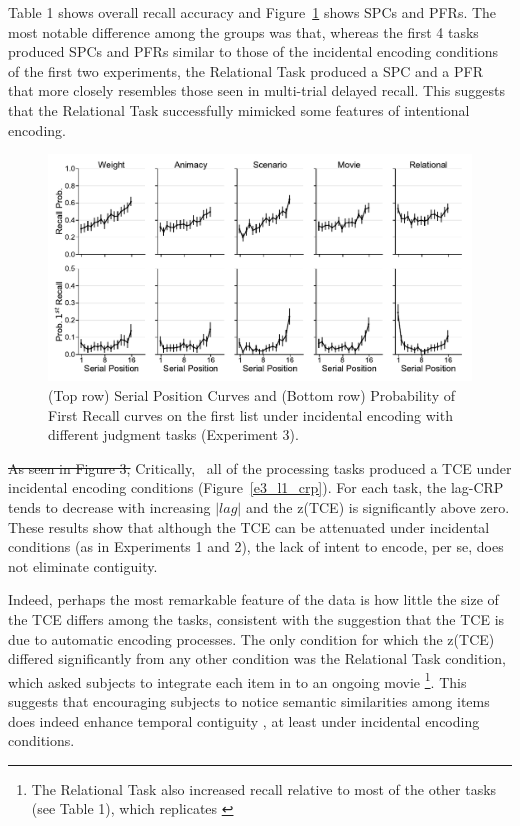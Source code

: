 \documentclass[man,natbib,floatsintext]{apa6} %
\begin{document}
\color{red}
Table 1 shows overall recall accuracy and Figure~\ref{e3_l1_spc} shows SPCs and PFRs. The most notable difference among the groups was that, whereas the first 4 tasks produced SPCs and PFRs similar to those of the incidental encoding conditions of the first two experiments, the Relational Task produced a SPC and a PFR that more closely resembles those seen in multi-trial delayed recall. This suggests that the Relational Task successfully mimicked some features of intentional encoding.

\begin{figure}
\includegraphics{figures/E3_spc_list1.pdf}
\caption{(Top row) Serial Position Curves and (Bottom row) Probability of First Recall curves on the first list under incidental encoding with different judgment tasks (Experiment 3). \spcpaneltext}
\label{e3_l1_spc}
\end{figure}

\color{black}

\st{As seen in Figure 3,} \color{red} Critically, \color{black}~all of the processing tasks produced a TCE under incidental encoding conditions \color{red}(Figure~\ref{e3_l1_crp})\color{black}. For each task, the lag-CRP tends to decrease with increasing $|lag|$ and the z(TCE) is significantly above zero. These results show that although the TCE can be attenuated under incidental conditions (as in Experiments 1 and 2), the lack of intent to encode, per se, does not eliminate contiguity. 

Indeed, perhaps the most remarkable feature of the data is how little the size of the TCE differs among the tasks, consistent with the suggestion that the TCE is due to automatic encoding processes. The only condition for which the z(TCE) differed significantly from any other condition was the Relational Task condition, which asked subjects to integrate each item in to an ongoing movie \footnote{The Relational Task also increased recall relative to most of the other tasks (see Table 1), which replicates \citet{BowClar69}}. This suggests that encouraging subjects to notice semantic similarities among items does indeed enhance temporal contiguity \citep{Hint16}, at least under incidental encoding conditions. 
\end{document}
